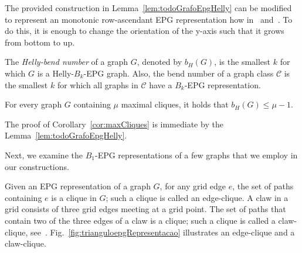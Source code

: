  
%  


 The provided construction in Lemma~\ref{lem:todoGrafoEpgHelly} can be modified to represent an monotonic row-ascendant EPG representation how in~\cite{golumbic2009} and~\cite{golumbic2013}. To do this, it is enough to change the orientation of the y-axis such that it grows from bottom to up.


\begin{definition}
The \emph{Helly-bend number} of a graph $G$, denoted by $b_H(G)$, is the smallest $k$ for which $G$ is a Helly-$B_k$-EPG graph. Also, the bend number of a graph class ${\mathcal C}$ is the smallest $k$ for which all graphs in ${\mathcal C}$ have a $B_k$-EPG representation.
\end{definition}
 
\begin{corollary}\label{cor:maxCliques}
For every graph $G$ containing $\mu$ maximal cliques, it holds that $b_H(G)\leq \mu -1$. 
\end{corollary}


The proof of Corollary~\ref{cor:maxCliques}  is immediate by the Lemma~\ref{lem:todoGrafoEpgHelly}.

Next, we examine the $B_1$-EPG representations of a few graphs that we employ in our constructions.

\medskip

Given an EPG representation of a graph $G$, for any grid edge $e$, the set of paths containing $e$ is a clique in $G$; such a clique is called an edge-clique. A claw in a grid consists of three grid edges meeting at a grid point. The set of paths that contain two of the three edges of a claw is a clique; such a clique is called a claw-clique, see~\cite{golumbic2009}. Fig.~\ref{fig:trianguloepgRepresentacao} illustrates an edge-clique and a claw-clique.

